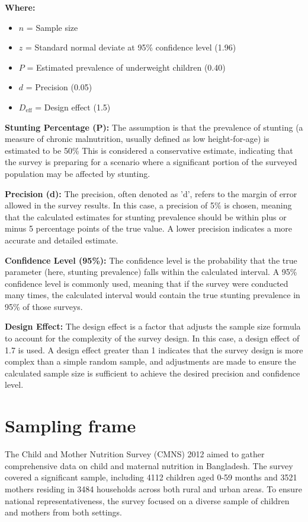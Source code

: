 \documentclass{report}
\begin{document}
\textbf{Where:}


\begin{itemize}
\item $n$ = Sample size
\item $z$ = Standard normal deviate at 95\% confidence level (1.96)
\item $P$ = Estimated prevalence of underweight children (0.40)
\item $d$ = Precision (0.05)
\item $D_{\text{eff}}$ = Design effect (1.5)
\end{itemize}

\pagebreak

\textbf{Stunting Percentage (P):} The assumption is that the prevalence of stunting (a measure of chronic malnutrition, usually defined as low height-for-age) is estimated to be 50\% This is considered a conservative estimate, indicating that the survey is preparing for a scenario where a significant portion of the surveyed population may be affected by stunting.

\textbf{Precision (d):} The precision, often denoted as 'd', refers to the margin of error allowed in the survey results. In this case, a precision of 5\% is chosen, meaning that the calculated estimates for stunting prevalence should be within plus or minus 5 percentage points of the true value. A lower precision indicates a more accurate and detailed estimate.

\textbf{Confidence Level (95\%):} The confidence level is the probability that the true parameter (here, stunting prevalence) falls within the calculated interval. A 95\% confidence level is commonly used, meaning that if the survey were conducted many times, the calculated interval would contain the true stunting prevalence in 95\% of those surveys.

\textbf{Design Effect:} The design effect is a factor that adjusts the sample size formula to account for the complexity of the survey design. In this case, a design effect of 1.7 is used. A design effect greater than 1 indicates that the survey design is more complex than a simple random sample, and adjustments are made to ensure the calculated sample size is sufficient to achieve the desired precision and confidence level.


\section{Sampling frame}
The Child and Mother Nutrition Survey (CMNS) 2012 aimed to gather comprehensive data on child and maternal nutrition in Bangladesh. The survey covered a significant sample, including 4112 children aged 0-59 months and 3521 mothers residing in 3484 households across both rural and urban areas. To ensure national representativeness, the survey focused on a diverse sample of children and mothers from both settings.
\end{document}

